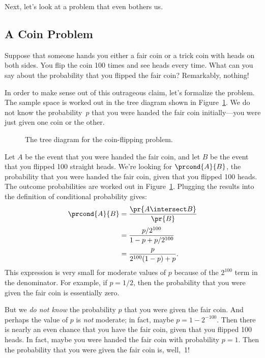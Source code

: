 \iffalse

Next, let's look at a problem that even bothers us.

\subsection{A Coin Problem}

Suppose that someone hands you either a fair coin or a trick coin with
heads on both sides.  You flip the coin 100 times and see heads every
time.  What can you say about the probability that you flipped the
fair coin?  Remarkably, nothing!

In order to make sense out of this outrageous claim, let's formalize
the problem.  The sample space is worked out in the tree diagram shown
in Figure~\ref{fig:15C2}.  We do not know the probability~$p$ that you
were handed the fair coin initially---you were just given one coin or
the other.
%
\begin{figure}[h]


\caption{The tree diagram for the coin-flipping problem.}

\label{fig:15C2}

\end{figure}
%
Let $A$ be the event that you were handed the fair coin, and let $B$
be the event that you flipped 100 straight heads.  We're looking
for $\prcond{A}{B}$, the probability that you were handed the fair
coin, given that you flipped 100 heads.  The outcome probabilities are
worked out in Figure~\ref{fig:15C2}.  Plugging the results into the
definition of conditional probability gives:
%
\begin{align*}
\prcond{A}{B}	& = \frac{\pr{A \intersect B}}{\pr{B}} \\[2pt]
		& = \frac{p / 2^{100}}{1 - p + p / 2^{100}} \\[2pt]
		& = \frac{p}{2^{100} (1 - p) + p}.
\end{align*}
%
This expression is very small for moderate values of $p$ because of
the $2^{100}$ term in the denominator.  For example, if $p = 1/2$,
then the probability that you were given the fair coin is essentially
zero.

But we \emph{do not know} the probability $p$ that you were given
the fair coin.  And perhaps the value of $p$ is \emph{not} moderate;
in fact, maybe $p = 1 - 2^{-100}$.  Then there is nearly an even
chance that you have the fair coin, given that you flipped 100 heads.
In fact, maybe you were handed the fair coin with probability $p = 1$.
Then the probability that you were given the fair coin is, well,~1!

